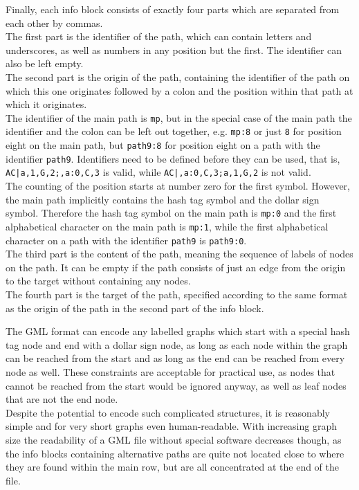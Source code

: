 \documentclass[a4paper,12pt,twoside,BCOR=10mm]{scrbook}
\begin{document}
Finally, each info block consists of exactly four parts which are separated from each other by commas. \\
The first part is the identifier of the path, which can contain letters and underscores, 
as well as numbers in any position but the first. 
The identifier can also be left empty. \\
The second part is the origin of the path, 
containing the identifier of the path on which this one 
originates followed by a colon and the position within that path 
at which it originates. \\
The identifier of the main path is \texttt{mp}, but in the special case of the main path the 
identifier and the colon can be left out together, e.g. \texttt{mp:8} or just \texttt{8} for position eight 
on the main path, but \texttt{path9:8} for position eight on a path with the identifier \texttt{path9}.
Identifiers need to be defined before they can be used, that 
is, \texttt{AC|a,1,G,2;,a:0,C,3} is valid, while \texttt{AC|,a:0,C,3;a,1,G,2} is not valid. \\
The counting of the position starts at number zero for the first symbol. 
However, the main path implicitly contains the hash tag symbol and the dollar sign symbol. 
Therefore the hash tag symbol on the main path is \texttt{mp:0} and 
the first alphabetical character on the main path is \texttt{mp:1}, 
while the first alphabetical character on a path with the identifier \texttt{path9} is \texttt{path9:0}. \\
The third part is the content of the path, meaning the sequence of labels of nodes on the path. 
It can be empty if the path consists of just an edge from the origin to the target without containing any nodes. \\
The fourth part is the target of the path, 
specified according to the same format as the origin of the path in the second part of the info block.

The GML format can encode any labelled graphs which start with a special hash tag node 
and end with a dollar sign node, as long as each node within the graph 
can be reached from the start and as long as the end can be reached from 
every node as well. These constraints are acceptable for practical use, 
as nodes that cannot be reached from the start would be ignored anyway, 
as well as leaf nodes that are not the end node. \\
Despite the potential to encode such complicated structures, it is reasonably 
simple and for very short graphs even human-readable. 
With increasing graph size the readability of a GML file without special software 
decreases though, as the info blocks containing alternative paths are quite not 
located close to where they are found within the main row, but are all concentrated at the end of the file.
\end{document}
